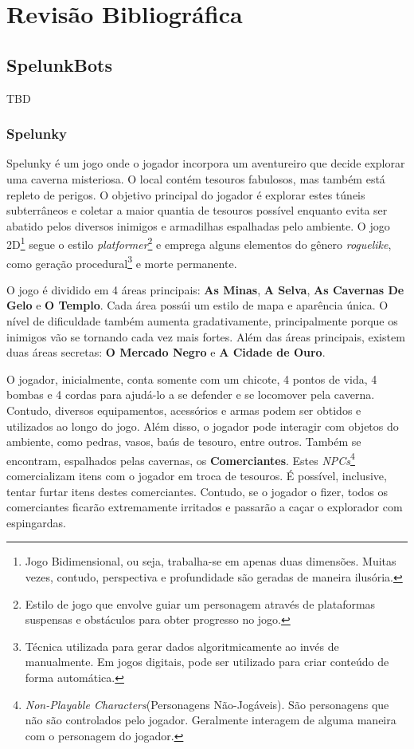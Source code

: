 \chapter{\label{chap:lit-review}Revisão Bibliográfica}

\section{SpelunkBots} TBD

\subsection{Spelunky}
Spelunky \cite{SPELUNKYWEB} é um jogo onde o jogador incorpora um aventureiro
que decide explorar uma caverna misteriosa. O local contém tesouros fabulosos,
mas também está repleto de perigos. O objetivo principal do jogador é explorar
estes túneis subterrâneos e coletar a maior quantia de tesouros possível
enquanto evita ser abatido pelos diversos inimigos e armadilhas espalhadas pelo
ambiente. O jogo 2D\footnote{Jogo Bidimensional, ou seja, trabalha-se em apenas
duas dimensões. Muitas vezes, contudo, perspectiva e profundidade são geradas de
maneira ilusória.} segue o estilo \textit{platformer}\footnote{Estilo de jogo
que envolve guiar um personagem através de plataformas suspensas e obstáculos
para obter progresso no jogo.} e emprega alguns elementos do gênero
\textit{roguelike}, como geração procedural\footnote{Técnica utilizada para
gerar dados algoritmicamente ao invés de manualmente. Em jogos digitais, pode
ser utilizado para criar conteúdo de forma automática.} e morte permanente.

O jogo é dividido em 4 áreas principais: \textbf{As Minas}, \textbf{A Selva},
\textbf{As Cavernas De Gelo} e \textbf{O Templo}. Cada área possúi um estilo de
mapa e aparência única. O nível de dificuldade também aumenta gradativamente,
principalmente porque os inimigos vão se tornando cada vez mais fortes. Além das
áreas principais, existem duas áreas secretas: \textbf{O Mercado Negro} e
\textbf{A Cidade de Ouro}.

O jogador, inicialmente, conta somente com um chicote, 4 pontos de vida, 4
bombas e 4 cordas para ajudá-lo a se defender e se locomover pela caverna.
Contudo, diversos equipamentos, acessórios e armas podem ser obtidos e
utilizados ao longo do jogo. Além disso, o jogador pode interagir com objetos do
ambiente, como pedras, vasos, baús de tesouro, entre outros. Também se
encontram, espalhados pelas cavernas, os \textbf{Comerciantes}. Estes
\textit{NPCs}\footnote{\textit{Non-Playable Characters}(Personagens
Não-Jogáveis). São personagens que não são controlados pelo jogador. Geralmente
interagem de alguma maneira com o personagem do jogador.} comercializam itens
com o jogador em troca de tesouros. É possível, inclusive, tentar furtar itens
destes comerciantes. Contudo, se o jogador o fizer, todos os comerciantes
ficarão extremamente irritados e passarão a caçar o explorador com espingardas.

